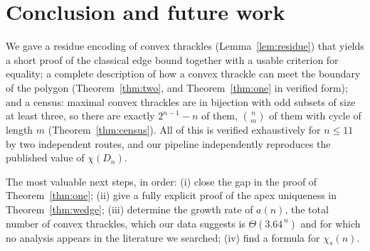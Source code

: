 \documentclass[11pt,a4paper]{article}
\theoremstyle{definition}
\theoremstyle{plain}
\begin{document}
\section{Conclusion and future work}

We gave a residue encoding of convex thrackles (Lemma~\ref{lem:residue}) that
yields a short proof of the classical edge bound together with a usable
criterion for equality; a complete description of how a convex thrackle can
meet the boundary of the polygon (Theorem~\ref{thm:two}, and
Theorem~\ref{thm:one} in verified form); and a census: maximal convex thrackles
are in bijection with odd subsets of size at least three, so there are exactly
$2^{n-1}-n$ of them, $\binom nm$ of them with cycle of length $m$
(Theorem~\ref{thm:census}).  All of this is verified exhaustively for $n\le11$
by two independent routes, and our pipeline independently reproduces the
published value of $\chi(D_n)$.

The most valuable next steps, in order: (i) close the gap in the proof of
Theorem~\ref{thm:one}; (ii) give a fully explicit proof of the apex uniqueness in
Theorem~\ref{thm:wedge}; (iii) determine the growth rate of $a(n)$, the total
number of convex thrackles, which our data suggests is
$\Theta(3.64^{\,n})$ and for which no analysis appears in the literature we
searched; (iv) find a formula for $\chi_s(n)$.
\end{document}
